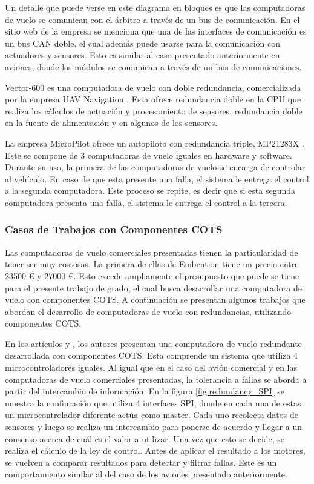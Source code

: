 
Un detalle que puede verse en este diagrama en bloques es que las computadoras de vuelo se comunican con el árbitro a través de un bus de comunicación. En el sitio web de la empresa se menciona que una de las interfaces de comunicación es un bus CAN doble, el cual además puede usarse para la comunicación con actuadores y sensores. Esto es similar al caso presentado anteriormente en aviones, donde los módulos se comunican a través de un bus de comunicaciones.

Vector-600 es una computadora de vuelo con doble redundancia, comercializada por la empresa UAV Navigation \cite{uav-navigation-vector-600}. Esta ofrece redundancia doble en la CPU que realiza los cálculos de actuación y procesamiento de sensores, redundancia doble en la fuente de alimentación y en algunos de los sensores.

La empresa MicroPilot ofrece un autopiloto con redundancia triple, MP21283X \cite{wwwmicropilotcom-no-date}. Este se compone de 3 computadoras de vuelo iguales en hardware y software. Durante su uso, la primera de las computadoras de vuelo se encarga de controlar al vehículo. En caso de que esta presente una falla, el sistema le entrega el control a la segunda computadora. Este proceso se repite, es decir que si esta segunda computadora presenta una falla, el sistema le entrega el control a la tercera.

\subsubsection{Casos de Trabajos con Componentes COTS}

Las computadoras de vuelo comerciales presentadas tienen la particularidad de tener ser muy costosas. La primera de ellas de Embention tiene un precio entre 23500 \euro{} y 27000 \euro{}. Esto excede ampliamente el presupuesto que puede se tiene para el presente trabajo de grado, el cual busca desarrollar una computadora de vuelo con componentes COTS. A continuación se presentan algunos trabajos que abordan el desarrollo de computadoras de vuelo con redundancias, utilizando componentes COTS.

En los artículos \cite{hiergeist2018implementation} y \cite{hiergeist2017internal}, los autores presentan una computadora de vuelo redundante desarrollada con componentes COTS. Esta comprende un sistema que utiliza 4 microcontroladores iguales. Al igual que en el caso del avión comercial y en las computadoras de vuelo comerciales presentadas, la tolerancia a fallas se aborda a partir del intercambio de información. En la figura \ref{fig:redundancy_SPI} se muestra la confiuración que utiliza 4 interfaces SPI, donde en cada una de estas un microcontrolador diferente actúa como master. Cada uno recolecta datos de sensores y luego se realiza un intercambio para ponerse de acuerdo y llegar a un consenso acerca de cuál es el valor a utilizar. Una vez que esto se decide, se realiza el cálculo de la ley de control. Antes de aplicar el resultado a los motores, se vuelven a comparar resultados para detectar y filtrar fallas. Este es un comportamiento similar al del caso de los aviones presentado anteriormente.

